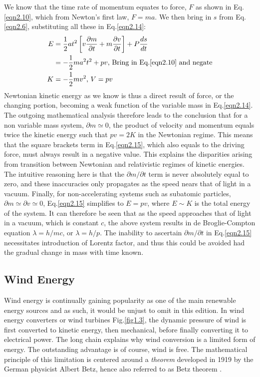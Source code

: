 \noindent We know that the time rate of momentum equates to force, $F$ as shown in Eq.\eqref{eqn2.10}, which from Newton's first law, $F=ma$. We then bring in $s$ from Eq.\eqref{eqn2.6}, substituting all these in Eq.\eqref{eqn2.14}: 
\begin{eqnarray}
\begin{split}
E &= \frac{1}{2}at^2\left[ v\frac{\partial m}{\partial t}+ m\frac{\partial v}{\partial t}\right] +P\frac{ds}{dt}   \\
&= -\frac{1}{2}ma^2t^2 + pv\text{, Bring in Eq.\eqref{eqn2.10} and negate}\\
K& = -\frac{1}{2}mv^2\text{, }V = pv
\label{eqn2.15}
\end{split}
\end{eqnarray}
\noindent Newtonian kinetic energy as we know is thus a direct result of force, or the changing portion, becoming a weak function of the variable mass in Eq.\eqref{eqn2.14}. The outgoing mathematical analysis therefore leads to the conclusion that for a non variable mass system, $\partial m \simeq 0$, the product of velocity and momentum equals twice the kinetic energy such that $pv = 2K$ in the Newtonian regime. This means that the square brackets term in Eq.\eqref{eqn2.15}, which also equals to the driving force, must always result in a negative value. This explains the disparities arising from transition between Newtonian and relativistic regimes of kinetic energies. The intuitive reasoning here is that the $\partial m/\partial t$ term is never absolutely equal to zero, and these inaccuracies only propagates as the speed nears that of light in a vacuum. Finally, for non-accelerating systems such as subatomic particles, $\partial m\simeq\partial v\simeq0$, Eq.\eqref{eqn2.15} simplifies to $E=pv$, where $E\sim K$ is the total energy of the system. It can therefore be seen that as the speed approaches that of light in a vacuum, which is constant $c$, the above system results in de Broglie-Compton equation $\lambda = h/mc$, or $\lambda=h/p$. The inability to ascertain $\partial m/\partial t$ in Eq.\eqref{eqn2.15} necessitates introduction of Lorentz factor, and thus this could be avoided had the gradual change in mass with time known.      
\newpage
\subsection{Wind Energy}
\label{winen}
\noindent Wind energy is continually gaining popularity as one of the main renewable energy sources and as such, it would be unjust to omit in this edition. In wind energy converters or wind turbines Fig.\ref{fig1.3}, the dynamic pressure of wind is first converted to kinetic energy, then mechanical, before finally converting it to electrical power. The long chain explains why wind conversion is a limited form of energy. The outstanding advantage is of course, wind is free. The mathematical principle of this limitation is centered around a \emph{theorem} developed in 1919 by the German physicist Albert Betz, hence also referred to as Betz theorem \cite{betz1920}.

